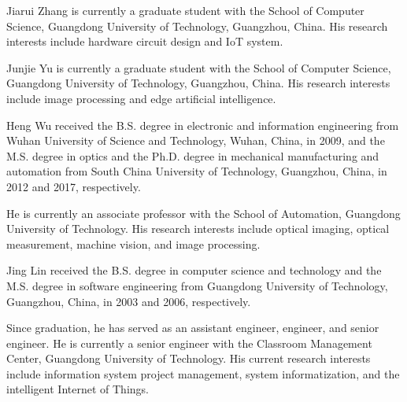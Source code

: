 \documentclass[journal]{IEEEtran}
\begin{document}
\begin{IEEEbiographynophoto}{Jiarui Zhang}
is currently a graduate student with the School of Computer Science, Guangdong University of Technology, Guangzhou, China. His research interests include hardware circuit design and IoT system.
\end{IEEEbiographynophoto}

\begin{IEEEbiographynophoto}{Junjie Yu}
is currently a graduate student with the School of Computer Science, Guangdong University of Technology, Guangzhou, China. His research interests include image processing and edge artificial intelligence.
\end{IEEEbiographynophoto}

\begin{IEEEbiographynophoto}{Heng Wu}
received the B.S. degree in electronic and information engineering from Wuhan University of Science and Technology, Wuhan, China, in 2009, and the M.S. degree in optics and the Ph.D. degree in mechanical manufacturing and automation from South China University of Technology, Guangzhou, China, in 2012 and 2017, respectively.

He is currently an associate professor with the School of Automation, Guangdong University of Technology. His research interests include optical imaging, optical measurement, machine vision, and image processing.
\end{IEEEbiographynophoto}

\begin{IEEEbiographynophoto}{Jing Lin}
received the B.S. degree in computer science and technology and the M.S. degree in software engineering from Guangdong University of Technology, Guangzhou, China, in 2003 and 2006, respectively.

Since graduation, he has served as an assistant engineer, engineer, and senior engineer. He is currently a senior engineer with the Classroom Management Center, Guangdong University of Technology. His current research interests include information system project management, system informatization, and the intelligent Internet of Things.
\end{IEEEbiographynophoto}
\end{document}
